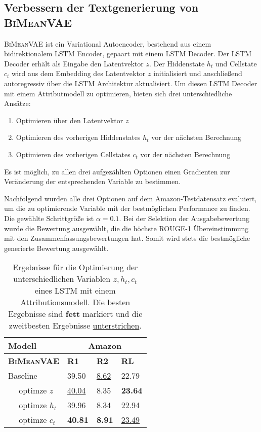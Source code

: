 \subsection{Verbessern der Textgenerierung von \textsc{BiMeanVAE}}
\textsc{BiMeanVAE} ist ein Variational Autoencoder, bestehend aus einem bidirektionalem LSTM Encoder, gepaart mit einem LSTM Decoder.
Der LSTM Decoder erhält als Eingabe den Latentvektor $z$. Der Hiddenstate $h_t$ und Cellstate $c_t$ wird aus dem Embedding des Latentvektor $z$ initialisiert und anschließend autoregressiv über die LSTM Architektur aktualisiert.
Um diesen LSTM Decoder mit einem Attributmodell zu optimieren, bieten sich drei unterschiedliche Ansätze:
\begin{enumerate}
    \item Optimieren über den Latentvektor $z$
    \item Optimieren des vorherigen Hiddenstates $h_t$ vor der nächsten Berechnung
    \item Optimieren des vorherigen Cellstates $c_t$ vor der nächsten Berechnung
\end{enumerate}

Es ist möglich, zu allen drei aufgezählten Optionen einen Gradienten zur Veränderung der entsprechenden Variable zu bestimmen. 

Nachfolgend wurden alle drei Optionen auf dem Amazon-Testdatensatz evaluiert, um die zu optimierende Variable mit der bestmöglichen Performance zu finden.
Die gewählte Schrittgröße ist $\alpha = 0.1$.
Bei der Selektion der Ausgabebewertung wurde die Bewertung ausgewählt, die die höchste ROUGE-1 Übereinstimmung mit den Zusammenfassungsbewertungen hat.
Somit wird stets die bestmögliche generierte Bewertung ausgewählt.

\begin{table}[h!]
    \centering
    \begin{tabular}{@{}llll@{}}
    \toprule
                    Modell   & \multicolumn{3}{c}{Amazon}              \\ \midrule
    \textbf{\textsc{BiMeanVAE}}    & \textbf{R1} & \textbf{R2} & \textbf{RL} \\ \midrule
    Baseline        & 39.50       & \underline{8.62}     &  22.79     \\
    $\quad$ optimze $z$        &   \underline{40.04}     &   8.35    &    \textbf{23.64}   \\
    $\quad$ optimze $h_t$      &  39.96   &    8.34  &  22.94  \\
    $\quad$ optimze $c_t$      &  \textbf{40.81}   &     \textbf{8.91}  &   \underline{23.49}    \\ \bottomrule
    \end{tabular}
    \caption{Ergebnisse für die Optimierung der unterschiedlichen Variablen $z,h_t,c_t$ eines LSTM mit einem Attributionsmodell. Die besten Ergebnisse sind \textbf{fett} markiert und die zweitbesten Ergebnisse \underline{unterstrichen}.}
    \label{opt_bimeanvae}
\end{table}

